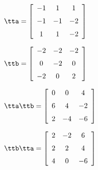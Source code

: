 {$\tta = \left[ \begin {array}{ccc} -1&1&1\\\noalign{\medskip}-1&-1&-2
\\\noalign{\medskip}1&1&-2\end {array} \right]  $ 

$\ttb =  \left[ \begin {array}{ccc} -2&-2&-2\\\noalign{\medskip}0&-2&0
\\\noalign{\medskip}-2&0&2\end {array} \right]  
    $}
{$\tta\ttb = \left[ \begin {array}{ccc} 0&0&4\\\noalign{\medskip}6&4&-2
\\\noalign{\medskip}2&-4&-6\end {array} \right]   $

$\ttb\tta = \left[ \begin {array}{ccc} 2&-2&6\\\noalign{\medskip}2&2&4
\\\noalign{\medskip}4&0&-6\end {array} \right] $ }

 